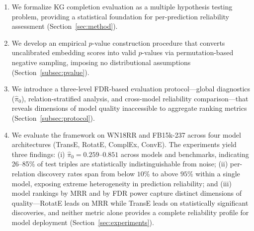 \begin{enumerate}
    \item We formalize KG completion evaluation as a multiple hypothesis testing problem, providing a statistical foundation for per-prediction reliability assessment (Section~\ref{sec:method}).

    \item We develop an empirical $p$-value construction procedure that converts uncalibrated embedding scores into valid $p$-values via permutation-based negative sampling, imposing no distributional assumptions (Section~\ref{subsec:pvalue}).

    \item We introduce a three-level FDR-based evaluation protocol---global diagnostics ($\hat{\pi}_0$), relation-stratified analysis, and cross-model reliability comparison---that reveals dimensions of model quality inaccessible to aggregate ranking metrics (Section~\ref{subsec:protocol}).

    \item We evaluate the framework on WN18RR and FB15k-237 across four model architectures (TransE, RotatE, ComplEx, ConvE). The experiments yield three findings: (i) $\hat{\pi}_0 = 0.259$--$0.851$ across models and benchmarks, indicating 26--85\% of test triples are statistically indistinguishable from noise; (ii) per-relation discovery rates span from below $10\%$ to above $95\%$ within a single model, exposing extreme heterogeneity in prediction reliability; and (iii) model rankings by MRR and by FDR power capture distinct dimensions of quality---RotatE leads on MRR while TransE leads on statistically significant discoveries, and neither metric alone provides a complete reliability profile for model deployment (Section~\ref{sec:experiments}).
\end{enumerate}
